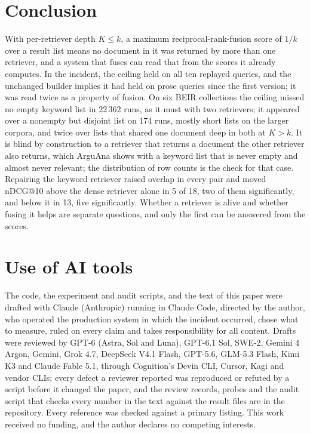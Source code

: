 \documentclass[11pt]{article}
\begin{document}
\section{Conclusion}
\label{sec:conclusion}

With per-retriever depth $K \le k$, a maximum reciprocal-rank-fusion score of $1/k$ over a result list means no document in it was returned by more than one retriever, and a system that fuses can read that from the scores it already computes. In the incident, the ceiling held on all ten replayed queries, and the unchanged builder implies it had held on prose queries since the first version; it was read twice as a property of fusion. On six BEIR collections the ceiling missed no empty keyword list in 22\,362 runs, as it must with two retrievers; it appeared over a nonempty but disjoint list on 174 runs, mostly short lists on the larger corpora, and twice over lists that shared one document deep in both at $K > k$. It is blind by construction to a retriever that returns a document the other retriever also returns, which ArguAna shows with a keyword list that is never empty and almost never relevant; the distribution of row counts is the check for that case. Repairing the keyword retriever raised overlap in every pair and moved nDCG@10 above the dense retriever alone in 5 of 18, two of them significantly, and below it in 13, five significantly. Whether a retriever is alive and whether fusing it helps are separate questions, and only the first can be answered from the scores.

\section*{Use of AI tools}

The code, the experiment and audit scripts, and the text of this paper were drafted with Claude (Anthropic) running in Claude Code, directed by the author, who operated the production system in which the incident occurred, chose what to measure, ruled on every claim and takes responsibility for all content. Drafts were reviewed by GPT-6 (Astra, Sol and Luna), GPT-6.1 Sol, SWE-2, Gemini 4 Argon, Gemini, Grok 4.7, DeepSeek V4.1 Flash, GPT-5.6, GLM-5.3 Flash, Kimi K3 and Claude Fable 5.1, through Cognition's Devin CLI, Cursor, Kagi and vendor CLIs; every defect a reviewer reported was reproduced or refuted by a script before it changed the paper, and the review records, probes and the audit script that checks every number in the text against the result files are in the repository. Every reference was checked against a primary listing. This work received no funding, and the author declares no competing interests.
\end{document}
